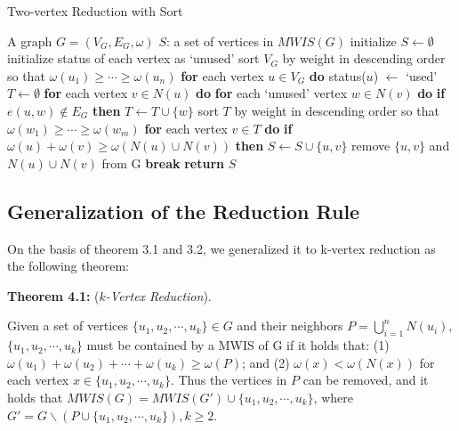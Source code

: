 \documentclass[sigconf, nonacm]{acmart}
\begin{document}
\begin{algorithm}[tbp]
\caption{Two-vertex Reduction with Sort}
\label{alg:2vertexsort}
\begin{algorithmic}[1]
	\REQUIRE A graph $G=(V_G,E_G,\omega)$
	\ENSURE $S$: a set of vertices in $MWIS(G)$
	\STATE   initialize $S\leftarrow \emptyset$
	\STATE   initialize status of each vertex as `unused'
	\STATE   sort $V_G$ by weight in descending order so that $\omega(u_1)\geq\cdots\geq\omega(u_n)$
	\STATE   \textbf{for} each vertex $u\in V_G$ \textbf{do}
	\STATE   \quad status($u$) $\leftarrow$ `used'
	\STATE   \quad $T \leftarrow \emptyset$
	\STATE   \quad \textbf{for} each vertex $v\in N(u)$ \textbf{do}
	\STATE   \quad \quad \textbf{for} each `unused' vertex $w\in N(v)$ \textbf{do}
	\STATE   \quad \quad \quad \textbf{if} $e(u,w) \notin E_G$ \textbf{then}
	\STATE   \quad \quad \quad \quad $T \leftarrow T \cup \{w\}$
	\STATE   \quad sort $T$ by weight in descending order so that $\omega(w_1)\geq\cdots\geq\omega(w_m)$
	\STATE   \quad \textbf{for} each vertex $v\in T$ \textbf{do}
	\STATE   \quad \quad \textbf{if} $\omega(u)+\omega(v)\geq \omega(N(u)\cup N(v))$ \textbf{then}
	\STATE   \quad \quad \quad $S\leftarrow S\cup\{u,v\}$
	\STATE   \quad \quad \quad remove $\{u,v\}$ and $N(u)\cup N(v)$ from G
	\STATE   \quad \quad \quad \textbf{break}
	\STATE   \textbf{return} $S$
\end{algorithmic}
\end{algorithm}

\subsection{Generalization of the Reduction Rule}

On the basis of theorem 3.1 and 3.2, we generalized it to k-vertex reduction as the following theorem:

\begin{framed}
\noindent\textbf{Theorem 4.1:} (\emph{$k$-Vertex Reduction}). 

Given a  set of vertices $\{u_1, u_2, \cdots, u_k\}\in G$ and their neighbors $P=\bigcup_{i=1}^nN(u_i)$, $\{u_1, u_2, \cdots, u_k\}$ must be contained by a MWIS of G if it holds that: (1) $\omega(u_1) + \omega(u_2) + \cdots + \omega(u_k) \geq \omega(P)$; and (2) $\omega(x) < \omega(N(x))$ for each vertex $x\in\{u_1, u_2, \cdots, u_k\}$. Thus the vertices in $P$ can be removed, and it holds that $MWIS(G) = MWIS(G')\cup\{u_1, u_2, \cdots, u_k\}$, where $G'=G\backslash (P\cup\{u_1, u_2, \cdots, u_k\}), k \geq 2$.
\end{framed}
\end{document}
